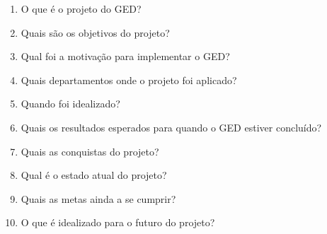 \begin{apendicesenv}
\begin{enumerate}
    \item O que é o projeto do GED?
    \item Quais são os objetivos do projeto?
    \item Qual foi a motivação para implementar o GED?
    \item Quais departamentos onde o projeto foi aplicado?
    \item Quando foi idealizado?
    \item Quais os resultados esperados para quando o GED estiver concluído?
    \item Quais as conquistas do projeto?
    \item Qual é o estado atual do projeto?
    \item Quais as metas ainda a se cumprir?
    \item O que é idealizado para o futuro do projeto?
\end{enumerate}

\end{apendicesenv} 
